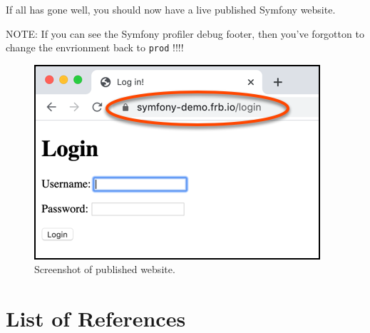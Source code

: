 \documentclass[a4paperpaper,openright]{book}
\begin{document}
If all has gone well, you should now have a live published Symfony
website.

NOTE: If you can see the Symfony profiler debug footer, then you've
forgotton to change the envrionment back to \texttt{prod} !!!!

\begin{figure}
\centering
\includegraphics{./tex2pdf.-05a85d9d563be472/5239b2fa165edca2271d5022397983741a2d25bb.png}
\caption{Screenshot of published website.}
\end{figure}

\backmatter

\hypertarget{list-of-references}{%
\chapter{List of References}\label{list-of-references}}
\end{document}
